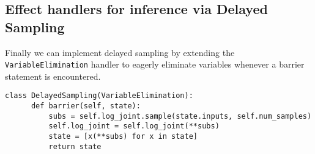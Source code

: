 \documentclass[anonymous=false, %
               format=acmsmall, %
               review=true, %
               screen=true, %
               nonacm=true]{acmart}
\begin{document}
\subsection{Effect handlers for inference via Delayed Sampling}
Finally we can implement delayed sampling by extending the \verb$VariableElimination$ handler to eagerly eliminate variables whenever a barrier statement is encountered.
\label{sec:appendix:delayed}
\begin{Verbatim}[samepage=true]
  class DelayedSampling(VariableElimination):
      def barrier(self, state):
          subs = self.log_joint.sample(state.inputs, self.num_samples)
          self.log_joint = self.log_joint(**subs)
          state = [x(**subs) for x in state]
          return state
\end{Verbatim}
\end{document}
